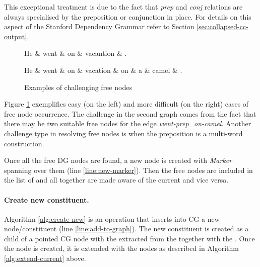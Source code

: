     This exceptional treatment is due to the fact that \textit{prep} and \textit{conj} relations are always specialised by the preposition or conjunction in place. For details on this aspect of the Stanford Dependency Grammar refer to Section \ref{sec:collapsed-cc-output}.

    \begin{figure}[!ht]
    \centering
    \begin{minipage}[b]{0.35\textwidth}
    \centering
    	\begin{dependency}
    		\begin{deptext}[]
    	He \& went \& on \& vacantion \& . \\
    		\end{deptext}
    	\end{dependency}
    \end{minipage}
    \begin{minipage}[b]{0.55\textwidth}
    	\begin{dependency}
    		\begin{deptext}[]
    	He \& went \& on \& vacation \& on \& a \& camel \& . \\
    		\end{deptext}
    	\end{dependency}
    \end{minipage}
    \caption{Examples of challenging free nodes}
    \label{fig:challenging-free-nodes}
    \end{figure}

    Figure \ref{fig:challenging-free-nodes} exemplifies easy (on the left) and more difficult (on the right) cases of free node occurrence. The challenge in the second graph comes from the fact that there may be two suitable free nodes for the edge \textit{went-\mbox{prep\_on}-camel}. Another challenge type in resolving free nodes is when the preposition is a multi-word construction. 

    Once all the free DG nodes are found, a new \cg node is created with \textit{Marker} \elementType spanning over them (line \ref{line:new-marker}). Then the free nodes are included in the list of \Children and all together are made aware of the current \cgPointer and vice versa. 

    \paragraph{Create new constituent.} Algorithm \ref{alg:create-new} is an operation that inserts into CG a new node/constituent (line \ref{line:add-to-graph}). The new constituent is created as a child of a pointed CG node with the \elementType extracted from the \rt together with the \operation. Once the \cg node is created, it is extended with the \Children nodes as described in Algorithm \ref{alg:extend-current} above.

